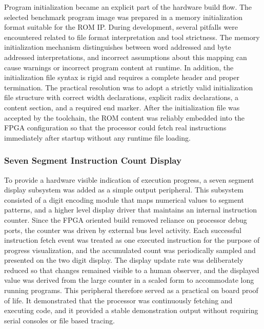 \documentclass[12pt]{article}
\begin{document}
Program initialization became an explicit part of the hardware build flow. The selected benchmark program image was prepared in a memory initialization format suitable for the ROM IP. During development, several pitfalls were encountered related to file format interpretation and tool strictness. The memory initialization mechanism distinguishes between word addressed and byte addressed interpretations, and incorrect assumptions about this mapping can cause warnings or incorrect program content at runtime. In addition, the initialization file syntax is rigid and requires a complete header and proper termination. The practical resolution was to adopt a strictly valid initialization file structure with correct width declarations, explicit radix declarations, a content section, and a required end marker. After the initialization file was accepted by the toolchain, the ROM content was reliably embedded into the FPGA configuration so that the processor could fetch real instructions immediately after startup without any runtime file loading.

\subsubsection{Seven Segment Instruction Count Display}
To provide a hardware visible indication of execution progress, a seven segment display subsystem was added as a simple output peripheral. This subsystem consisted of a digit encoding module that maps numerical values to segment patterns, and a higher level display driver that maintains an internal instruction counter. Since the FPGA oriented build removed reliance on processor debug ports, the counter was driven by external bus level activity. Each successful instruction fetch event was treated as one executed instruction for the purpose of progress visualization, and the accumulated count was periodically sampled and presented on the two digit display. The display update rate was deliberately reduced so that changes remained visible to a human observer, and the displayed value was derived from the large counter in a scaled form to accommodate long running programs. This peripheral therefore served as a practical on board proof of life. It demonstrated that the processor was continuously fetching and executing code, and it provided a stable demonstration output without requiring serial consoles or file based tracing.
\end{document}
